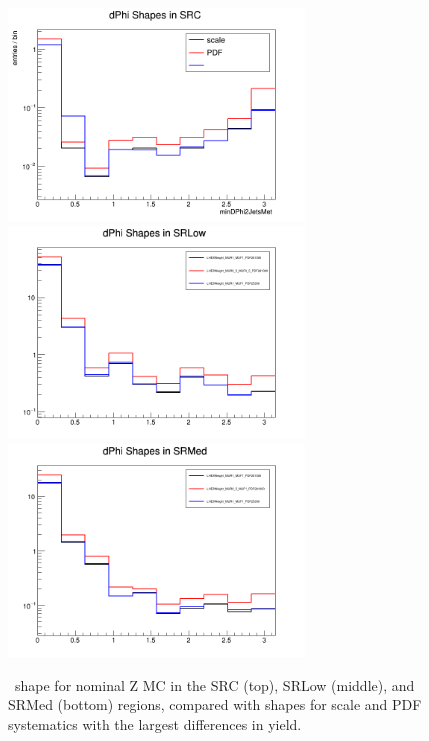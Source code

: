 \begin{figure}[tbhp]
\centering
\includegraphics[width=0.7\textwidth]{Images/SUSY/validate_SRC.png}
\includegraphics[width=0.7\textwidth]{Images/SUSY/validate_SRLow.png}
\includegraphics[width=0.7\textwidth]{Images/SUSY/validate_SRMed.png}
\caption{
\mindphijm\ shape for nominal Z MC in the SRC (top), SRLow (middle), and SRMed (bottom) regions, compared with shapes for scale and PDF systematics with the largest differences in yield.
}
\label{fig:mindphijm_validate} 
\end{figure}